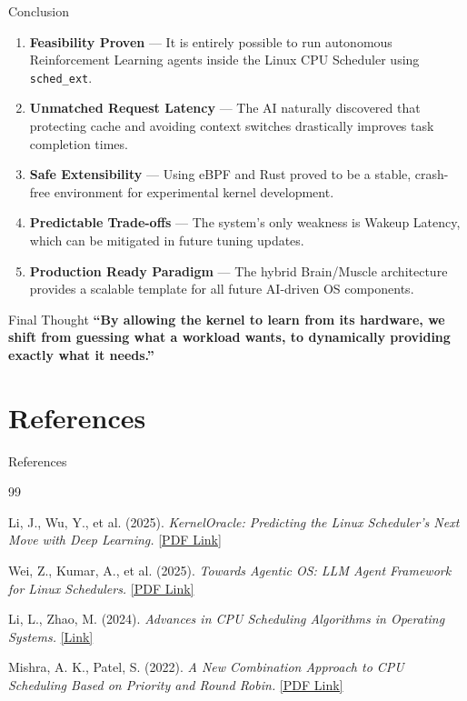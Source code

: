 \documentclass[aspectratio=169]{beamer}
\begin{document}
\begin{frame}{Conclusion}
        \begin{enumerate}\small\itemsep4pt
          \item \textbf{Feasibility Proven} — It is entirely possible to run autonomous Reinforcement Learning agents inside the Linux CPU Scheduler using \texttt{sched\_ext}.
          \item \textbf{Unmatched Request Latency} — The AI naturally discovered that protecting cache and avoiding context switches drastically improves task completion times.
          \item \textbf{Safe Extensibility} — Using eBPF and Rust proved to be a stable, crash-free environment for experimental kernel development.
          \item \textbf{Predictable Trade-offs} — The system's only weakness is Wakeup Latency, which can be mitigated in future tuning updates.
          \item \textbf{Production Ready Paradigm} — The hybrid Brain/Muscle architecture provides a scalable template for all future AI-driven OS components.
        \end{enumerate}
  \begin{alertblock}{Final Thought}
    \centering
    \textbf{``By allowing the kernel to learn from its hardware, we shift from guessing what a workload wants, to dynamically providing exactly what it needs.''}
  \end{alertblock}
\end{frame}

\section{References}
\begin{frame}[allowframebreaks]{References}
\small
\begin{thebibliography}{99}

Li, J., Wu, Y., et al. (2025).
\textit{KernelOracle: Predicting the Linux Scheduler's Next Move with Deep Learning.}
\href{https://arxiv.org/pdf/2505.15213.pdf}{[PDF Link]}

Wei, Z., Kumar, A., et al. (2025).
\textit{Towards Agentic OS: LLM Agent Framework for Linux Schedulers.}
\href{https://arxiv.org/pdf/2509.01245.pdf}{[PDF Link]}

Li, L., Zhao, M. (2024).
\textit{Advances in CPU Scheduling Algorithms in Operating Systems.}
\href{https://www.researchgate.net/publication/387444718}{[Link]}

Mishra, A. K., Patel, S. (2022).
\textit{A New Combination Approach to CPU Scheduling Based on Priority and Round Robin.}
\href{https://thesai.org/Downloads/Volume13No4/Paper_63 A_New_Combination_Approach_to_CPU_Scheduling.pdf}{[PDF Link]}

\end{thebibliography}
\end{frame}
\end{document}
